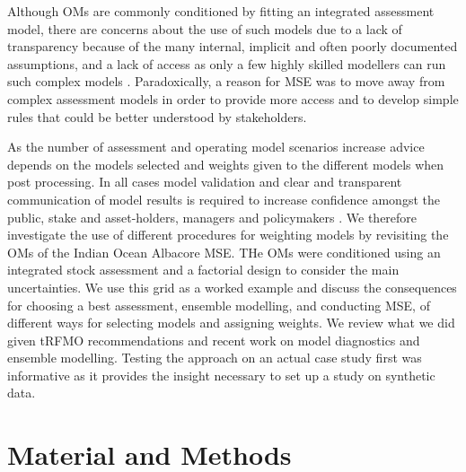 \documentclass[a4paper]{article}
\begin{document}
Although OMs are commonly conditioned by fitting an integrated assessment model, there are concerns about the use of such models due to a lack of transparency because of the many internal, implicit and often poorly documented assumptions, and a lack of access as only a few highly skilled modellers can run such complex models \citep{hilborn2003state}. Paradoxically, a reason for MSE was to move away from complex assessment models in order to provide more access and to develop simple rules that could be better understood by stakeholders. 

As the number of assessment and operating model scenarios increase advice depends on the models selected and weights given to the different models when post processing. In all cases model validation and clear and transparent communication of model results is required to increase confidence amongst the public, stake and asset-holders, managers and policymakers \citep[][]{saltelli2020five}. We therefore investigate the use of different procedures for weighting models by revisiting the OMs of the Indian Ocean Albacore MSE. THe OMs were conditioned using an integrated stock assessment and a factorial design to consider the main uncertainties. We use this grid as a worked example and discuss the consequences for choosing a best assessment, ensemble modelling, and conducting MSE, of different ways for selecting models and assigning weights. We review what we did given tRFMO recommendations and recent work on model diagnostics and ensemble modelling. Testing the approach on an actual case study first was informative as it provides the insight necessary to set up a study on synthetic data. 

\section*{Material and Methods}
\end{document}
